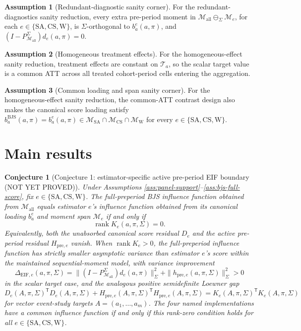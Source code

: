 \documentclass[11pt]{article}
\newcommand{\transpose}{\mathsf{T}}
\theoremstyle{definition}
\newtheorem{assumption}{Assumption}
\theoremstyle{plain}
\newtheorem{conjecture}{Conjecture}
\theoremstyle{remark}
\begin{document}
\begin{assumption}[Redundant-diagnostic sanity corner]\label{ass:redundant-diagnostic}
For the redundant-diagnostics sanity reduction, every extra pre-period moment
in \(\mathcal M_{\mathrm{all}}\ominus_{\Sigma}\mathcal M_e\), for each
\(e\in\{\mathrm{SA},\mathrm{CS},\mathrm{W}\}\), is \(\Sigma\)-orthogonal to
\(b_a^e(a,\pi)\), and
\((I-P_{\mathcal M_{\mathrm{all}}}^{\Sigma})d_e(a,\pi)=0\).
\end{assumption}

\begin{assumption}[Homogeneous treatment effects]\label{ass:homogeneous-effect}
For the homogeneous-effect sanity reduction, treatment effects are constant on
\(\mathcal T_a\), so the scalar target value is a common ATT across all
treated cohort-period cells entering the aggregation.
\end{assumption}

\begin{assumption}[Common loading and span sanity corner]\label{ass:common-loading-span}
For the homogeneous-effect sanity reduction, the common-ATT contrast design
also makes the canonical score loading satisfy
\(b_a^{\mathrm{BJS}}(a,\pi)=b_a^e(a,\pi)\in
\mathcal M_{\mathrm{SA}}\cap\mathcal M_{\mathrm{CS}}\cap\mathcal M_{\mathrm{W}}\)
for every \(e\in\{\mathrm{SA},\mathrm{CS},\mathrm{W}\}\).
\end{assumption}

\section{Main results}
\begin{conjecture}[Conjecture 1: estimator-specific active pre-period EIF boundary (NOT YET PROVED)]\label{conj:active-preperiod-boundary}
Under Assumptions \ref{ass:panel-support}--\ref{ass:bjs-full-score}, fix
\(e\in\{\mathrm{SA},\mathrm{CS},\mathrm{W}\}\).  The full-preperiod BJS
influence function obtained from \(\mathcal M_{\mathrm{all}}\) equals
estimator \(e\)'s influence function obtained from its canonical loading
\(b_a^e\) and moment span \(\mathcal M_e\) if and only if
\[
  \operatorname{rank}K_e(a,\pi,\Sigma)=0.
\]
Equivalently, both the unabsorbed canonical score residual \(D_e\) and the
active pre-period residual \(H_{\mathrm{pre},e}\) vanish.  When
\(\operatorname{rank}K_e>0\), the full-preperiod influence
function has strictly smaller asymptotic variance than estimator \(e\)'s
score within the maintained sequential-moment model, with variance improvement
\[
  \Delta_{\mathrm{EIF},e}(a,\pi,\Sigma)
  =
  \|(I-P_{\mathcal M_{\mathrm{all}}}^{\Sigma})d_e(a,\pi)\|_{\Sigma}^{2}
  +\|h_{\mathrm{pre},e}(a,\pi,\Sigma)\|_{\Sigma}^{2}>0
\]
in the scalar target case, and the analogous positive semidefinite Loewner gap
\[
  D_e(A,\pi,\Sigma)^{\transpose}D_e(A,\pi,\Sigma)
  +H_{\mathrm{pre},e}(A,\pi,\Sigma)^{\transpose}
   H_{\mathrm{pre},e}(A,\pi,\Sigma)
  =K_e(A,\pi,\Sigma)^{\transpose}K_e(A,\pi,\Sigma)
\]
for vector event-study targets \(A=(a_1,\ldots,a_m)\).  The four named
implementations have a common influence function if
and only if this rank-zero condition holds for all
\(e\in\{\mathrm{SA},\mathrm{CS},\mathrm{W}\}\).
\end{conjecture}
\end{document}
